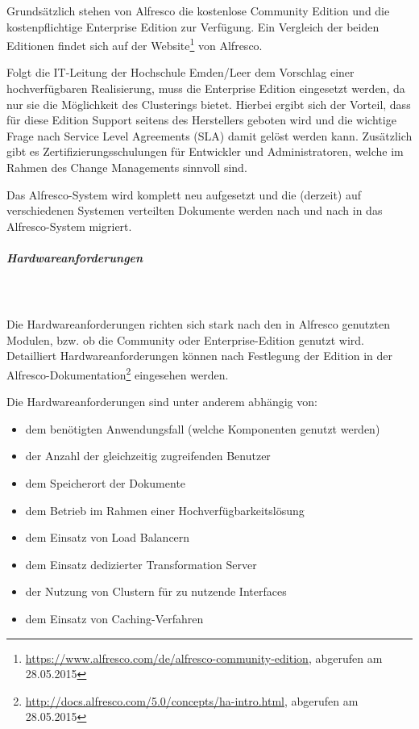 Grundsätzlich stehen von Alfresco die kostenlose Community Edition und die kostenpflichtige Enterprise Edition zur Verfügung. Ein Vergleich der beiden Editionen findet sich auf der Website\footnote{\url{https://www.alfresco.com/de/alfresco-community-edition}, abgerufen am 28.05.2015} von Alfresco.

Folgt die IT-Leitung der Hochschule Emden/Leer dem Vorschlag einer hochverfügbaren Realisierung, muss die Enterprise Edition eingesetzt werden, da nur sie die Möglichkeit des Clusterings bietet. Hierbei ergibt sich der Vorteil, dass für diese Edition Support seitens des Herstellers geboten wird und die wichtige Frage nach Service Level Agreements (SLA) damit gelöst werden kann. Zusätzlich gibt es Zertifizierungsschulungen für Entwickler und Administratoren, welche im Rahmen des Change Managements sinnvoll sind.

Das Alfresco-System wird komplett neu aufgesetzt und die (derzeit) auf verschiedenen Systemen verteilten Dokumente werden nach und nach in das Alfresco-System migriert.

\subparagraph{Hardwareanforderungen}\mbox{}\\\\
Die Hardwareanforderungen richten sich stark nach den in Alfresco genutzten Modulen, bzw. ob die Community oder Enterprise-Edition genutzt wird. Detailliert Hardwareanforderungen können nach Festlegung der Edition in der Alfresco-Dokumentation\footnote{\url{http://docs.alfresco.com/5.0/concepts/ha-intro.html}, abgerufen am 28.05.2015} eingesehen werden. 

Die Hardwareanforderungen sind unter anderem abhängig von:

\begin{itemize}
	\item dem benötigten Anwendungsfall (welche Komponenten genutzt werden)
	\item der Anzahl der gleichzeitig zugreifenden Benutzer
	\item dem Speicherort der Dokumente
	\item dem Betrieb im Rahmen einer Hochverfügbarkeitslösung
	\item dem Einsatz von Load Balancern
	\item dem Einsatz dedizierter Transformation Server
	\item der Nutzung von Clustern für zu nutzende Interfaces
	\item dem Einsatz von Caching-Verfahren
\end{itemize}

